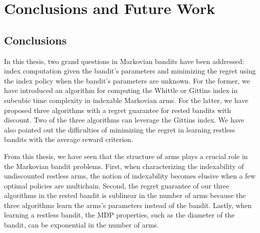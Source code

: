 \begingroup

\let\clearpage\relax

\chapter{Conclusions and Future Work}
\label{chapter:conclusion}


\section{Conclusions}

In this thesis, two grand questions in Markovian bandits have been addressed: index computation given the bandit's parameters and minimizing the regret using the index policy when the bandit's parameters are unknown.
For the former, we have introduced an algorithm for computing the Whittle or Gittins index in subcubic time complexity in indexable Markovian arms. 
For the latter, we have proposed three algorithms with a regret guarantee for rested bandits with discount.
Two of the three algorithms can leverage the Gittins index.
We have also pointed out the difficulties of minimizing the regret in learning restless bandits with the average reward criterion.

From this thesis, we have seen that the structure of arms plays a crucial role in the Markovian bandit problems.
First, when characterizing the indexability of undiscounted restless arms, the notion of indexability becomes elusive when a few optimal policies are multichain.
Second, the regret guarantee of our three algorithms in the rested bandit is sublinear in the number of arms because the three algorithms learn the arms's parameters instead of the bandit.
Lastly, when learning a restless bandit, the MDP properties, such as the diameter of the bandit, can be exponential in the number of arms.


